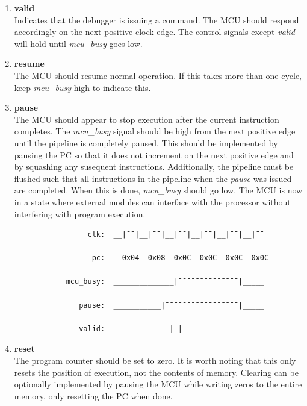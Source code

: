 \documentclass[10pt,a4paper]{article}
\begin{document}
\begin{enumerate}

    \item\textbf{valid}\\
    Indicates that the debugger is issuing a command. The MCU should respond accordingly on the next positive clock edge.
    The control signals except \emph{valid} will hold until \emph{mcu\_busy} goes low.

    \item\textbf{resume}\\
    The MCU should resume normal operation. If this takes more than one cycle, keep \emph{mcu\_busy
    }high to indicate this.

    \item\textbf{pause}\\
    The MCU should appear to stop execution after the current instruction completes. The
    \emph{mcu\_busy} signal should be high from the next positive edge until the pipeline is
    completely paused. This should be implemented by pausing the PC so that it does not increment
    on the next positive edge and by squashing any susequent instructions. Additionally, the pipeline
    must be flushed such that all instructions in the pipeline when the \emph{pause} was
    issued are completed. When this is done, \emph{mcu\_busy} should go low. The MCU is now in a
    state where external modules can interface with the processor without interfering with
    program execution.

        \begin{verbatim}
                 clk:  __|¯¯|__|¯¯|__|¯¯|__|¯¯|__|¯¯|__|¯¯

                  pc:    0x04  0x08  0x0C  0x0C  0x0C  0x0C

            mcu_busy:  ______________|¯¯¯¯¯¯¯¯¯¯¯¯¯¯|_____

               pause:  ___________|¯¯¯¯¯¯¯¯¯¯¯¯¯¯¯¯¯|_____

               valid:  _____________|¯|___________________
        \end{verbatim}

    \item\textbf{reset}\\
    The program counter should be set to zero. It is worth noting that this only resets the position of
    execution, not the contents of memory. Clearing can be optionally implemented by
    pausing the MCU while writing zeros to the entire memory, only resetting the PC when done.


\end{enumerate}
\end{document}

